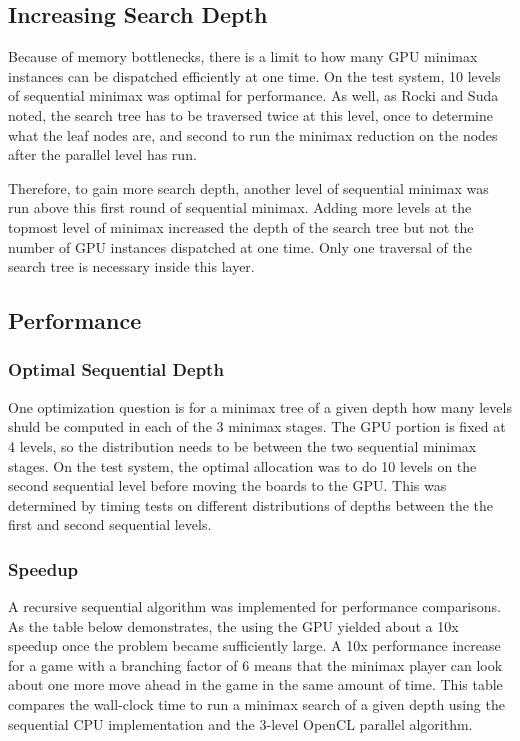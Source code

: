 \documentclass{article}
\begin{document}
\subsection{Increasing Search Depth}
Because of memory bottlenecks, there is a limit to how many GPU minimax instances can be dispatched efficiently at one time. On the test system, 10 levels of sequential minimax was optimal for performance. As well, as Rocki and Suda\cite{rockisuda10} noted, the search tree has to be traversed twice at this level, once to determine what the leaf nodes are, and second to run the minimax reduction on the nodes after the parallel level has run.

Therefore, to gain more search depth, another level of sequential minimax was run above this first round of sequential minimax. Adding more levels at the topmost level of minimax increased the depth of the search tree but not the number of GPU instances dispatched at one time. Only one traversal of the search tree is necessary inside this layer.

\subsection{Performance}
\subsubsection{Optimal Sequential Depth}
One optimization question is for a minimax tree of a given depth how many levels shuld be computed in each of the 3 minimax stages. The GPU portion is fixed at 4 levels, so the distribution needs to be between the two sequential minimax stages. On the test system, the optimal allocation was to do 10 levels on the second sequential level before moving the boards to the GPU. This was determined by timing tests on different distributions of depths between the the first and second sequential levels.

\subsubsection{Speedup}
A recursive sequential algorithm was implemented for performance comparisons. As the table below demonstrates, the using the GPU yielded about a 10x speedup once the problem became sufficiently large. A 10x performance increase for a game with a branching factor of 6 means that the minimax player can look about one more move ahead in the game in the same amount of time. This table compares the wall-clock time to run a minimax search of a given depth using the sequential CPU implementation and the 3-level OpenCL parallel algorithm.
\end{document}

